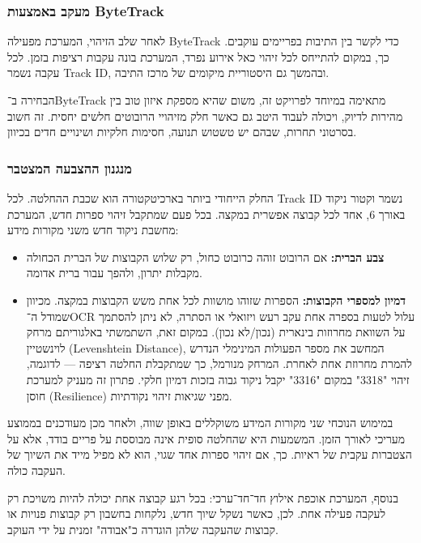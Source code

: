 \subsubsection{מעקב באמצעות \textenglish{ByteTrack}}

לאחר שלב הזיהוי, המערכת מפעילה \textenglish{ByteTrack} כדי לקשר בין
התיבות בפריימים עוקבים. כך, במקום להתייחס לכל זיהוי כאל אירוע נפרד,
המערכת בונה עקבות רציפות בזמן. לכל עקבה נשמר \textenglish{Track ID},
ובהמשך גם היסטוריית מיקומים של מרכז התיבה.

הבחירה ב־\textenglish{ByteTrack} מתאימה במיוחד לפרויקט זה, משום שהיא
מספקת איזון טוב בין מהירות לדיוק, ויכולה לעבוד היטב גם כאשר חלק
מזיהויי הרובוטים חלשים יחסית. זה חשוב בסרטוני תחרות, שבהם יש טשטוש
תנועה, חסימות חלקיות ושינויים חדים בכיוון.

\subsubsection{מנגנון ההצבעה המצטבר}

החלק הייחודי ביותר בארכיטקטורה הוא שכבת ההחלטה. לכל \textenglish{Track
ID} נשמר וקטור ניקוד באורך 6, אחד לכל קבוצה אפשרית במקצה. בכל פעם
שמתקבל זיהוי ספרות חדש, המערכת מחשבת ניקוד חדש משני מקורות מידע:

\begin{itemize}
\item \textbf{צבע הברית:} אם הרובוט זוהה כרובוט כחול, רק שלוש הקבוצות
  של הברית הכחולה מקבלות יתרון, ולהפך עבור ברית אדומה.
\item \textbf{דמיון למספרי הקבוצות:} הספרות שזוהו מושוות לכל אחת משש
  הקבוצות במקצה. מכיוון שמודל ה־OCR עלול לטעות בספרה אחת עקב רעש
  ויזואלי או הסתרה, לא ניתן להסתמך על השוואת מחרוזות בינארית (נכון/לא
  נכון). במקום זאת, השתמשתי באלגוריתם מרחק לוינשטיין
  (\textenglish{Levenshtein Distance}), המחשב את מספר הפעולות המינימלי
  הנדרש להמרת מחרוזת אחת לאחרת. המרחק מנורמל, כך שמתקבלת החלטה רציפה —
  לדוגמה, זיהוי "3318" במקום "3316" יקבל ניקוד גבוה בזכות דמיון
  חלקי. פתרון זה מעניק למערכת חוסן (\textenglish{Resilience}) מפני
  שגיאות זיהוי נקודתיות.
\end{itemize}

במימוש הנוכחי שני מקורות המידע משוקללים באופן שווה, ולאחר מכן מעודכנים
בממוצע מעריכי לאורך הזמן. המשמעות היא שהחלטה סופית אינה מבוססת על פריים
בודד, אלא על הצטברות עקבית של ראיות. כך, אם זיהוי ספרות אחד שגוי, הוא
לא מפיל מייד את השיוך של העקבה כולה.

בנוסף, המערכת אוכפת אילוץ חד־חד־ערכי: בכל רגע קבוצה אחת יכולה להיות
משויכת רק לעקבה פעילה אחת. לכן, כאשר נשקל שיוך חדש, נלקחות בחשבון רק
קבוצות פנויות או קבוצות שהעקבה שלהן הוגדרה כ"אבודה" זמנית על ידי
העוקב.

